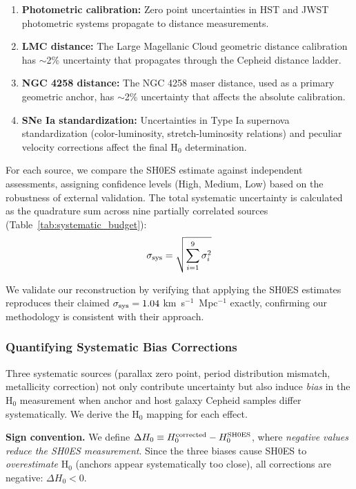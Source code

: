 \documentclass[preprint, linenumbers]{aastex701}
\begin{document}
\begin{enumerate}
\item \textbf{Photometric calibration:} Zero point uncertainties in HST and JWST photometric systems propagate to distance measurements.

\item \textbf{LMC distance:} The Large Magellanic Cloud geometric distance calibration has $\sim$2\% uncertainty that propagates through the Cepheid distance ladder.

\item \textbf{NGC 4258 distance:} The NGC 4258 maser distance, used as a primary geometric anchor, has $\sim$2\% uncertainty that affects the absolute calibration.

\item \textbf{SNe Ia standardization:} Uncertainties in Type Ia supernova standardization (color-luminosity, stretch-luminosity relations) and peculiar velocity corrections affect the final H$_0$ determination.
\end{enumerate}

For each source, we compare the SH0ES estimate against independent assessments, assigning confidence levels (High, Medium, Low) based on the robustness of external validation. The total systematic uncertainty is calculated as the quadrature sum across nine partially correlated sources (Table~\ref{tab:systematic_budget}):
\begin{equation}
\sigma_{\rm sys} = \sqrt{\sum_{i=1}^{9} \sigma_i^2}
\end{equation}

We validate our reconstruction by verifying that applying the SH0ES estimates reproduces their claimed $\sigma_{\rm sys} = 1.04$ km~s$^{-1}$~Mpc$^{-1}$ exactly, confirming our methodology is consistent with their approach.

\subsubsection{Quantifying Systematic Bias Corrections} \label{sec:methods_bias_derivations}

Three systematic sources (parallax zero point, period distribution mismatch, metallicity correction) not only contribute uncertainty but also induce \textit{bias} in the H$_0$ measurement when anchor and host galaxy Cepheid samples differ systematically. We derive the H$_0$ mapping for each effect.

\textbf{Sign convention.} We define $\Delta H_0 \equiv H_0^{\rm corrected} - H_0^{\rm SH0ES}$, where \textit{negative values reduce the SH0ES measurement}. Since the three biases cause SH0ES to \textit{overestimate} H$_0$ (anchors appear systematically too close), all corrections are negative: $\Delta H_0 < 0$.
\end{document}
